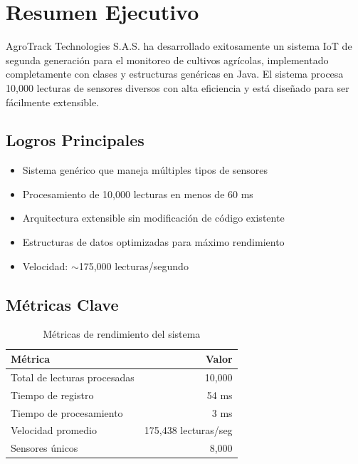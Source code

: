 \documentclass[12pt,a4paper]{article}
\begin{document}
\tableofcontents
\newpage


\listoftables
\newpage

\setcounter{page}{1}


\section{Resumen Ejecutivo}

AgroTrack Technologies S.A.S. ha desarrollado exitosamente un sistema IoT de segunda generación para el monitoreo de cultivos agrícolas, implementado completamente con clases y estructuras genéricas en Java. El sistema procesa 10,000 lecturas de sensores diversos con alta eficiencia y está diseñado para ser fácilmente extensible.

\subsection{Logros Principales}

\begin{itemize}[leftmargin=2cm]
    \item[$\bullet$] Sistema genérico que maneja múltiples tipos de sensores
    \item[$\bullet$] Procesamiento de 10,000 lecturas en menos de 60 ms
    \item[$\bullet$] Arquitectura extensible sin modificación de código existente
    \item[$\bullet$] Estructuras de datos optimizadas para máximo rendimiento
    \item[$\bullet$] Velocidad: $\sim$175,000 lecturas/segundo
\end{itemize}

\subsection{Métricas Clave}

\begin{table}[h]
\centering
\begin{tabular}{|l|r|}
\hline
\rowcolor{agrogreen!20}
\textbf{Métrica} & \textbf{Valor} \\
\hline
Total de lecturas procesadas & 10,000 \\
Tiempo de registro & 54 ms \\
Tiempo de procesamiento & 3 ms \\
Velocidad promedio & 175,438 lecturas/seg \\
Sensores únicos & 8,000 \\
\hline
\end{tabular}
\caption{Métricas de rendimiento del sistema}
\label{tab:metricas}
\end{table}
\end{document}

